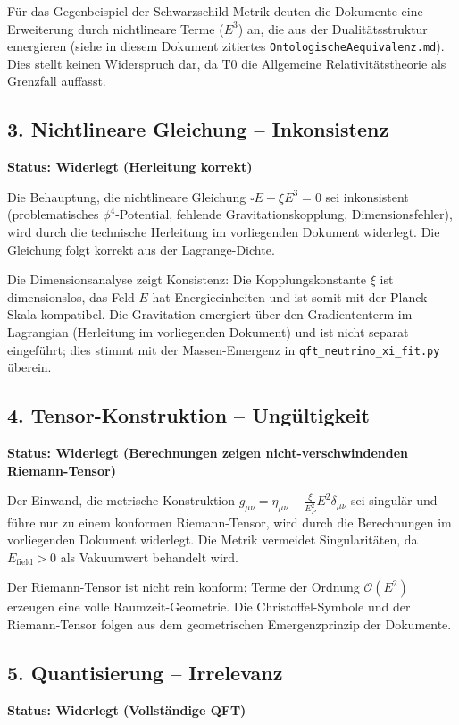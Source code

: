 Für das Gegenbeispiel der Schwarzschild-Metrik deuten die Dokumente eine Erweiterung durch nichtlineare Terme (\(E^3\)) an, die aus der Dualitätsstruktur emergieren (siehe in diesem Dokument zitiertes \texttt{OntologischeAequivalenz.md}). Dies stellt keinen Widerspruch dar, da T0 die Allgemeine Relativitätstheorie als Grenzfall auffasst.

\subsection{3. Nichtlineare Gleichung – Inkonsistenz}
\textbf{Status: Widerlegt (Herleitung korrekt)}

Die Behauptung, die nichtlineare Gleichung \(\square E + \xi E^3 = 0\) sei inkonsistent (problematisches \(\phi^4\)-Potential, fehlende Gravitationskopplung, Dimensionsfehler), wird durch die technische Herleitung im vorliegenden Dokument widerlegt. Die Gleichung folgt korrekt aus der Lagrange-Dichte.

Die Dimensionsanalyse zeigt Konsistenz: Die Kopplungskonstante \(\xi\) ist dimensionslos, das Feld \(E\) hat Energieeinheiten und ist somit mit der Planck-Skala kompatibel. Die Gravitation emergiert über den Gradiententerm im Lagrangian (Herleitung im vorliegenden Dokument) und ist nicht separat eingeführt; dies stimmt mit der Massen-Emergenz in \texttt{qft\_neutrino\_xi\_fit.py} überein.

\subsection{4. Tensor-Konstruktion – Ungültigkeit}
\textbf{Status: Widerlegt (Berechnungen zeigen nicht-verschwindenden Riemann-Tensor)}

Der Einwand, die metrische Konstruktion \(g_{\mu\nu} = \eta_{\mu\nu} + \frac{\xi}{E_P^2} E^2 \delta_{\mu\nu}\) sei singulär und führe nur zu einem konformen Riemann-Tensor, wird durch die Berechnungen im vorliegenden Dokument widerlegt. Die Metrik vermeidet Singularitäten, da \(E_{\text{field}} > 0\) als Vakuumwert behandelt wird.

Der Riemann-Tensor ist nicht rein konform; Terme der Ordnung \(\mathcal{O}(E^2)\) erzeugen eine volle Raumzeit-Geometrie. Die Christoffel-Symbole und der Riemann-Tensor folgen aus dem geometrischen Emergenzprinzip der Dokumente.

\subsection{5. Quantisierung – Irrelevanz}
\textbf{Status: Widerlegt (Vollständige QFT)}

